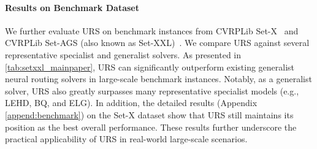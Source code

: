 \documentclass{article}
\theoremstyle{plain}
\theoremstyle{definition}
\theoremstyle{remark}
\begin{document}
\paragraph{Results on Benchmark Dataset}
We further evaluate URS on benchmark instances from CVRPLib Set-X~\citep{uchoa2017cvrplib_setx} and CVRPLib Set-AGS (also known as Set-XXL)~\citep{arnold2019cvrplib_xxl}. We compare URS against several representative specialist and generalist solvers. As presented in \cref{tab:setxxl_mainpaper}, URS can significantly outperform existing generalist neural routing solvers in large-scale benchmark instances. Notably, as a generalist solver, URS also greatly surpasses many representative specialist models (e.g., LEHD, BQ, and ELG). In addition, the detailed results (Appendix \ref{append:benchmark}) on the Set-X dataset show that URS still maintains its position as the best overall performance. These results further underscore the practical applicability of URS in real-world large-scale scenarios.
\end{document}
